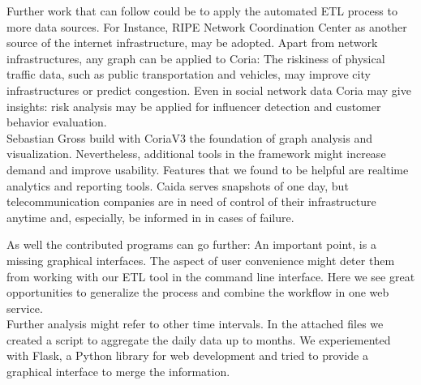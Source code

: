 \documentclass[conference, 11pt]{IEEEtran}
\begin{document}
Further work that can follow could be to apply the automated ETL process to more data sources. For Instance, RIPE Network Coordination Center \cite{RipeNCC} as another source of the internet infrastructure, may be adopted. Apart from network infrastructures, any graph can be applied to Coria: The riskiness of physical traffic data, such as public transportation and vehicles, may improve city infrastructures or predict congestion. Even in social network data Coria may give insights: risk analysis may be applied for influencer detection and customer behavior evaluation.\\

Sebastian Gross build with CoriaV3 the foundation of graph analysis and visualization. Nevertheless, additional tools in the framework might increase demand and improve usability. Features that we found to be helpful are realtime analytics and reporting tools. Caida serves snapshots of one day, but telecommunication companies are in need of control of their infrastructure anytime and, especially, be informed in in cases of failure.

As well the contributed programs can go further: An important point, is a missing graphical interfaces. The aspect of user convenience might deter them from working with our ETL tool in the command line interface. Here we see great opportunities to generalize the process and combine the workflow in one web service.\\
Further analysis might refer to other time intervals. In the attached files we created a script to aggregate the daily data up to months.
We experiemented with Flask, a Python library for web development \cite{Flask} and tried to provide a graphical interface to merge the information.


\end{document}
